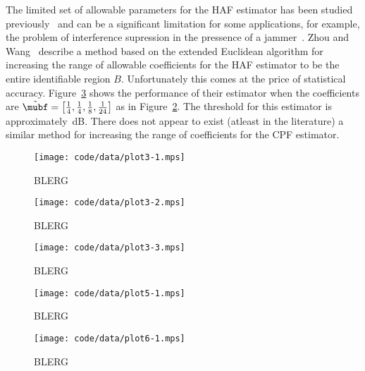 \documentclass[journal]{IEEEtran}
\begin{document}
The limited set of allowable parameters for the HAF estimator has been studied previously~\cite{Angeby_PPS_aliasing_2000,Djurovic_aliasing_2012,McKilliam2009IndentifiabliltyAliasingPolyphase,Zhou_lag_diverity_PPT_1997,Xia_dynamic_range_pps_2001} and can be a significant limitation for some applications, for example, the problem of interference supression in the pressence of a jammer~\cite{Djukanovic:2011:PMN:1950994.1951252,Djurovic_aliasing_2012}.  Zhou and Wang~\cite{Zhou_lag_diverity_PPT_1997} describe a method based on the extended Euclidean algorithm for increasing the range of allowable coefficients for the HAF estimator to be the entire identifiable region $B$.  Unfortunately this comes at the price of statistical accuracy.  Figure~\ref{plot:m3bigzw} shows the performance of their estimator when the coefficients are $\tilde{\mubf} = \left[ \tfrac{1}{4}, \tfrac{1}{4}, \tfrac{1}{8}, \tfrac{1}{24}  \right]$ as in Figure~\ref{plot:m3big}.  The threshold for this estimator is approximately~\unit[27]{dB}.  There does not appear to exist (atleast in the literature) a similar method for increasing the range of coefficients for the CPF estimator.

 
\begin{figure}[p] 
   	\centering 
  		\texttt{[image: code/data/plot3-1.mps]} 
  		\caption{BLERG} 
  		\label{plot:m3small} 
 \end{figure} 

\begin{figure}[p] 
   	\centering 
  		\texttt{[image: code/data/plot3-2.mps]} 
  		\caption{BLERG} 
  		\label{plot:m3big} 
 \end{figure} 

\begin{figure}[p] 
   	\centering 
  		\texttt{[image: code/data/plot3-3.mps]} 
  		\caption{BLERG} 
  		\label{plot:m3bigzw} 
 \end{figure} 

\begin{figure}[t] 
   	\centering 
  		\texttt{[image: code/data/plot5-1.mps]} 
  		\caption{BLERG} 
  		\label{plot:polyest} 
 \end{figure} 

\begin{figure}[t] 
   	\centering 
  		\texttt{[image: code/data/plot6-1.mps]} 
  		\caption{BLERG} 
  		\label{plot:polyest} 
 \end{figure} 

\end{document}
